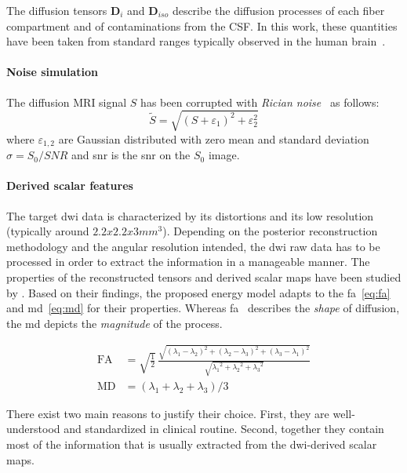 The diffusion tensors $\mathbf{D}_i$ and $\mathbf{D}_{iso}$ describe the diffusion 
processes of each fiber compartment and of contaminations from the CSF. In this work, 
these quantities have been taken from standard ranges typically observed in the 
human brain~\cite{Canales-Rodriguez:2009aa}.

\paragraph{Noise simulation}
The diffusion MRI signal $S$ has been corrupted with 
\textit{Rician noise}~\cite{Gudbjartsson:1995aa} as follows:
%
\begin{equation}
	\tilde{S} = \sqrt{ (S + \varepsilon_1)^2 + \varepsilon_2^2 }
\end{equation}
%
where $\varepsilon_{1,2}$ are Gaussian distributed with zero mean
and standard deviation $\sigma = S_0 / \mathit{SNR}$ and \acs{snr}
is the \ac{snr} on the $S_0$ image.

\paragraph{Derived scalar features}
The target \ac{dwi} data is characterized by its distortions and its
low resolution (typically around $2.2x2.2x3mm^3$). Depending on the
posterior reconstruction methodology and the angular resolution
intended, the \ac{dwi} raw data has to be processed in order to
extract the information in a manageable manner. The properties of
the reconstructed tensors and derived scalar maps have been
studied by \cite{ennis_orthogonal_2006}. Based on their
findings, the proposed energy model adapts to the \ac{fa}~\eqref{eq:fa} 
and \ac{md}~\eqref{eq:md} for their properties. 
Whereas \ac{fa} \ describes the \emph{shape} of diffusion, 
the \ac{md} depicts the \emph{magnitude} of the process. 

\begin{align}
\mathrm{FA} &= \sqrt{ \frac{1}{2}}\,\frac{\sqrt{ (\lambda_1 - \lambda_2)^2 + (\lambda_2 - \lambda_3)^2 + (\lambda_3 - \lambda_1)^2}}{\sqrt{ {\lambda_1}^2 + {\lambda_2}^2 + {\lambda_3}^2}} \label{eq:fa} \\
\mathrm{MD} &= ( \lambda_1 + \lambda_2 + \lambda_3 ) / 3 \label{eq:md}
\end{align}

There exist two main reasons to justify their choice. 
First, they are well-understood and standardized in clinical routine.
Second, together they contain most of the information that is
usually extracted from the \ac{dwi}-derived scalar maps. \\


